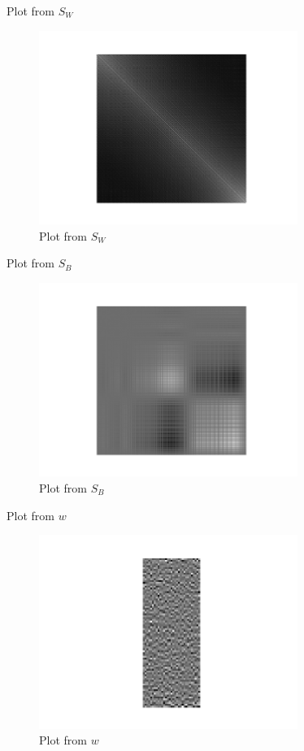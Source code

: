 \documentclass[handout]{beamer}
\begin{document}
\begin{frame}{Plot from $S_W$}
    {\centering
    \begin{figure}[H]
        \includegraphics[width=0.75\textwidth]{project_03/s_w.png}
        \caption{Plot from $S_W$}
    \end{figure}
    }
\end{frame}

\begin{frame}{Plot from $S_B$}
    {\centering
    \begin{figure}[H]
        \includegraphics[width=0.75\textwidth]{project_03/s_b.png}
        \caption{Plot from $S_B$}
    \end{figure}
    }
\end{frame}

\begin{frame}{Plot from $w$}
    {\centering
    \begin{figure}[H]
        \includegraphics[width=0.75\textwidth]{project_03/ww.png}
        \caption{Plot from $w$}
    \end{figure}
    }
\end{frame}
\end{document}
